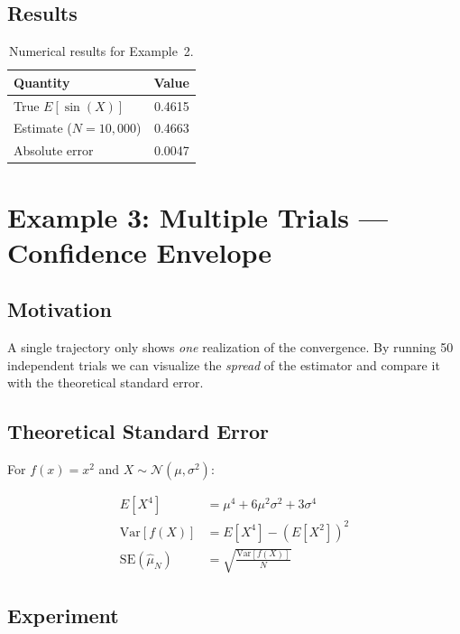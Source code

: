 \documentclass[12pt, a4paper]{article}
\begin{document}
\subsection{Results}

\begin{table}[H]
    \centering
    \begin{tabular}{lr}
        \toprule
        \textbf{Quantity} & \textbf{Value} \\
        \midrule
        True $E[\sin(X)]$           & 0.4615 \\
        Estimate ($N=10{,}000$)     & 0.4663 \\
        Absolute error              & 0.0047 \\
        \bottomrule
    \end{tabular}
    \caption{Numerical results for Example~2.}
    \label{tab:ex2}
\end{table}

\section{Example 3: Multiple Trials --- Confidence Envelope}
\label{sec:ex3}

\subsection{Motivation}

A single trajectory only shows \emph{one} realization of the
convergence.  By running 50 independent trials we can visualize the
\emph{spread} of the estimator and compare it with the theoretical
standard error.

\subsection{Theoretical Standard Error}

For $f(x) = x^2$ and $X \sim \mathcal{N}(\mu, \sigma^2)$:

\begin{align}
    E[X^4] &= \mu^4 + 6\mu^2\sigma^2 + 3\sigma^4 \\
    \mathrm{Var}[f(X)] &= E[X^4] - (E[X^2])^2 \\
    \mathrm{SE}(\hat{\mu}_N) &= \sqrt{\frac{\mathrm{Var}[f(X)]}{N}}
\end{align}

\subsection{Experiment}
\end{document}

